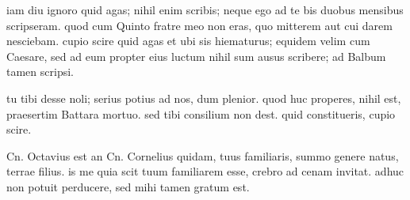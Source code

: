 


 iam diu ignoro quid agas; nihil enim scribis; neque ego ad te bis duobus mensibus scripseram. quod cum Quinto fratre meo non eras, quo mitterem aut cui darem nesciebam. cupio scire quid agas et ubi sis hiematurus; equidem velim cum Caesare, sed ad eum propter eius luctum nihil sum ausus scribere; ad Balbum tamen scripsi.

 tu tibi desse noli; serius potius ad nos, dum plenior. quod huc properes, nihil est, praesertim Battara mortuo. sed tibi consilium non dest. quid constitueris, cupio scire.

 Cn. Octavius est an Cn. Cornelius quidam, tuus familiaris, summo genere natus, terrae filius. is me quia scit tuum familiarem esse, crebro ad cenam invitat. adhuc non potuit perducere, sed mihi tamen gratum est.
